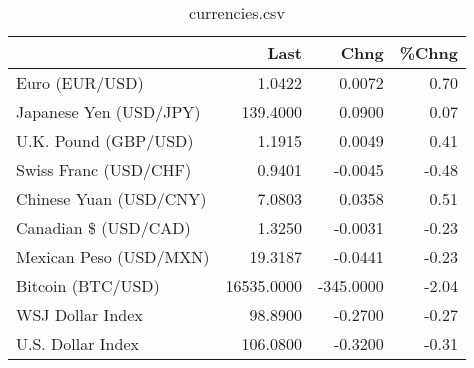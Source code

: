 \documentclass{article}%
\begin{document}
%


\begin{table}[htbp]%
\caption{currencies.csv}%
\centering%
\begin{adjustbox}{width=1\textwidth}%
\begin{tabular}{lrrr}
\toprule
                       &       Last &      Chng &  \%Chng \\
\midrule
        Euro (EUR/USD) &     1.0422 &    0.0072 &   0.70 \\
Japanese Yen (USD/JPY) &   139.4000 &    0.0900 &   0.07 \\
  U.K. Pound (GBP/USD) &     1.1915 &    0.0049 &   0.41 \\
 Swiss Franc (USD/CHF) &     0.9401 &   -0.0045 &  -0.48 \\
Chinese Yuan (USD/CNY) &     7.0803 &    0.0358 &   0.51 \\
  Canadian \$ (USD/CAD) &     1.3250 &   -0.0031 &  -0.23 \\
Mexican Peso (USD/MXN) &    19.3187 &   -0.0441 &  -0.23 \\
     Bitcoin (BTC/USD) & 16535.0000 & -345.0000 &  -2.04 \\
      WSJ Dollar Index &    98.8900 &   -0.2700 &  -0.27 \\
     U.S. Dollar Index &   106.0800 &   -0.3200 &  -0.31 \\
\bottomrule
\end{tabular}
%
\end{adjustbox}%
\end{table}

%
\end{document}
